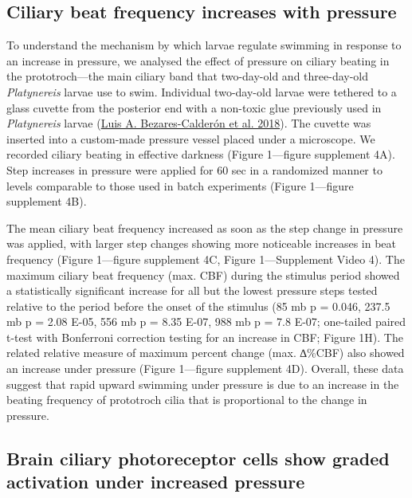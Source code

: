\documentclass[
]{article}
\begin{document}
\hypertarget{ciliary-beat-frequency-increases-with-pressure}{%
\subsection{Ciliary beat frequency increases with
pressure}\label{ciliary-beat-frequency-increases-with-pressure}}

To understand the mechanism by which larvae regulate swimming in
response to an increase in pressure, we analysed the effect of pressure
on ciliary beating in the prototroch---the main ciliary band that
two-day-old and three-day-old \emph{Platynereis} larvae use to swim.
Individual two-day-old larvae were tethered to a glass cuvette from the
posterior end with a non-toxic glue previously used in
\emph{Platynereis} larvae
(\protect\hyperlink{ref-bezares-calderon2018}{Luis A. Bezares-Calderón
et al. 2018}). The cuvette was inserted into a custom-made pressure
vessel placed under a microscope. We recorded ciliary beating in
effective darkness (Figure 1---figure supplement 4A). Step increases in
pressure were applied for 60 sec in a randomized manner to levels
comparable to those used in batch experiments (Figure 1---figure
supplement 4B).

The mean ciliary beat frequency increased as soon as the step change in
pressure was applied, with larger step changes showing more noticeable
increases in beat frequency (Figure 1---figure supplement 4C, Figure
1---Supplement Video 4). The maximum ciliary beat frequency (max. CBF)
during the stimulus period showed a statistically significant increase
for all but the lowest pressure steps tested relative to the period
before the onset of the stimulus (85 mb p = 0.046, 237.5 mb p = 2.08
E-05, 556 mb p = 8.35 E-07, 988 mb p = 7.8 E-07; one-tailed paired
t-test with Bonferroni correction testing for an increase in CBF; Figure
1H). The related relative measure of maximum percent change (max.
∆\%CBF) also showed an increase under pressure (Figure 1---figure
supplement 4D). Overall, these data suggest that rapid upward swimming
under pressure is due to an increase in the beating frequency of
prototroch cilia that is proportional to the change in pressure.

\hypertarget{brain-ciliary-photoreceptor-cells-show-graded-activation-under-increased-pressure}{%
\subsection{Brain ciliary photoreceptor cells show graded activation
under increased
pressure}\label{brain-ciliary-photoreceptor-cells-show-graded-activation-under-increased-pressure}}
\end{document}
